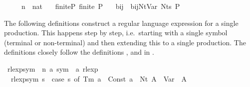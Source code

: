 \begin{isabellebody}
\ \ \ {\isasymgamma}{\isacharprime}{\kern0pt}\ {\isacharcolon}{\kern0pt}{\isacharcolon}{\kern0pt}\ {\isachardoublequoteopen}{\isacharprime}{\kern0pt}n\ {\isasymRightarrow}\ nat{\isachardoublequoteclose}\isanewline
\ \ \ finite{\isacharunderscore}{\kern0pt}P{\isacharcolon}{\kern0pt}\ {\isachardoublequoteopen}finite\ P{\isachardoublequoteclose}\isanewline
\ \ \ bij{\isacharunderscore}{\kern0pt}{\isasymgamma}{\isacharunderscore}{\kern0pt}{\isasymgamma}{\isacharprime}{\kern0pt}{\isacharcolon}{\kern0pt}\ \ {\isachardoublequoteopen}bij{\isacharunderscore}{\kern0pt}Nt{\isacharunderscore}{\kern0pt}Var\ {\isacharparenleft}{\kern0pt}Nts\ P{\isacharparenright}{\kern0pt}\ {\isasymgamma}\ {\isasymgamma}{\isacharprime}{\kern0pt}{\isachardoublequoteclose}\isanewline
{}%
\begin{isamarkuptext}%
The following definitions construct a regular language expression for a single production. This
happens step by step, i.e.\ starting with a single symbol (terminal or non-terminal) and then extending
this to a single production. The definitions closely follow the definitions ,
 and  in .%
\end{isamarkuptext}\isamarkuptrue%
\isamarkupfalse%
\ rlexp{\isacharunderscore}{\kern0pt}sym\ {\isacharcolon}{\kern0pt}{\isacharcolon}{\kern0pt}\ {\isachardoublequoteopen}{\isacharparenleft}{\kern0pt}{\isacharprime}{\kern0pt}n{\isacharcomma}{\kern0pt}\ {\isacharprime}{\kern0pt}a{\isacharparenright}{\kern0pt}\ sym\ {\isasymRightarrow}\ {\isacharprime}{\kern0pt}a\ rlexp{\isachardoublequoteclose}\ \isanewline
\ \ {\isachardoublequoteopen}rlexp{\isacharunderscore}{\kern0pt}sym\ s\ {\isacharequal}{\kern0pt}\ {\isacharparenleft}{\kern0pt}case\ s\ of\ Tm\ a\ {\isasymRightarrow}\ Const\ {\isacharbraceleft}{\kern0pt}{\isacharbrackleft}{\kern0pt}a{\isacharbrackright}{\kern0pt}{\isacharbraceright}{\kern0pt}\ {\isacharbar}{\kern0pt}\ Nt\ A\ {\isasymRightarrow}\ Var\ {\isacharparenleft}{\kern0pt}{\isasymgamma}{\isacharprime}{\kern0pt}\ A{\isacharparenright}{\kern0pt}{\isacharparenright}{\kern0pt}{\isachardoublequoteclose}\isanewline
\isanewline
{}\isamarkupfalse%

\end{isabellebody}
